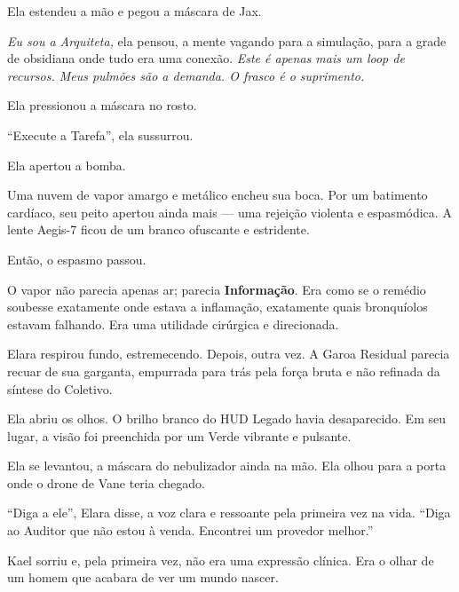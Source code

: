 Ela estendeu a mão e pegou a máscara de Jax.

\textit{Eu sou a Arquiteta,} ela pensou, a mente vagando para a simulação, para a grade de obsidiana onde tudo era uma conexão. \textit{Este é apenas mais um loop de recursos. Meus pulmões são a demanda. O frasco é o suprimento.}

Ela pressionou a máscara no rosto.

``Execute a Tarefa'', ela sussurrou.

Ela apertou a bomba.

Uma nuvem de vapor amargo e metálico encheu sua boca. Por um batimento cardíaco, seu peito apertou ainda mais --- uma rejeição violenta e espasmódica. A lente Aegis-7 ficou de um branco ofuscante e estridente.


Então, o espasmo passou.

O vapor não parecia apenas ar; parecia \textbf{Informação}. Era como se o remédio soubesse exatamente onde estava a inflamação, exatamente quais bronquíolos estavam falhando. Era uma utilidade cirúrgica e direcionada.

Elara respirou fundo, estremecendo. Depois, outra vez. A Garoa Residual parecia recuar de sua garganta, empurrada para trás pela força bruta e não refinada da síntese do Coletivo.

Ela abriu os olhos. O brilho branco do HUD Legado havia desaparecido. Em seu lugar, a visão foi preenchida por um Verde vibrante e pulsante.


Ela se levantou, a máscara do nebulizador ainda na mão. Ela olhou para a porta onde o drone de Vane teria chegado.

``Diga a ele'', Elara disse, a voz clara e ressoante pela primeira vez na vida. ``Diga ao Auditor que não estou à venda. Encontrei um provedor melhor.''

Kael sorriu e, pela primeira vez, não era uma expressão clínica. Era o olhar de um homem que acabara de ver um mundo nascer.
